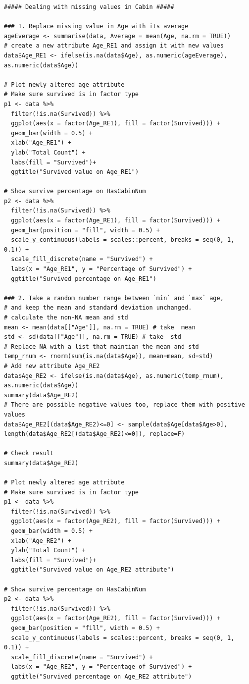\documentclass[
]{book}
\begin{document}
\begin{verbatim}
##### Dealing with missing values in Cabin #####

### 1. Replace missing value in Age with its average
ageEverage <- summarise(data, Average = mean(Age, na.rm = TRUE))
# create a new attribute Age_RE1 and assign it with new values
data$Age_RE1 <- ifelse(is.na(data$Age), as.numeric(ageEverage), as.numeric(data$Age))

# Plot newly altered age attribute
# Make sure survived is in factor type
p1 <- data %>%
  filter(!is.na(Survived)) %>%
  ggplot(aes(x = factor(Age_RE1), fill = factor(Survived))) +
  geom_bar(width = 0.5) +
  xlab("Age_RE1") +
  ylab("Total Count") +
  labs(fill = "Survived")+
  ggtitle("Survived value on Age_RE1")

# Show survive percentage on HasCabinNum
p2 <- data %>%
  filter(!is.na(Survived)) %>%
  ggplot(aes(x = factor(Age_RE1), fill = factor(Survived))) +
  geom_bar(position = "fill", width = 0.5) +
  scale_y_continuous(labels = scales::percent, breaks = seq(0, 1, 0.1)) +
  scale_fill_discrete(name = "Survived") +
  labs(x = "Age_RE1", y = "Percentage of Survived") +
  ggtitle("Survived percentage on Age_RE1")

### 2. Take a random number range between `min` and `max` age,
# and keep the mean and standard deviation unchanged.
# calculate the non-NA mean and std
mean <- mean(data[["Age"]], na.rm = TRUE) # take  mean
std <- sd(data[["Age"]], na.rm = TRUE) # take  std
# Replace NA with a list that maintian the mean and std
temp_rnum <- rnorm(sum(is.na(data$Age)), mean=mean, sd=std)
# Add new attribute Age_RE2
data$Age_RE2 <- ifelse(is.na(data$Age), as.numeric(temp_rnum), as.numeric(data$Age))
summary(data$Age_RE2)
# There are possible negative values too, replace them with positive values
data$Age_RE2[(data$Age_RE2)<=0] <- sample(data$Age[data$Age>0], length(data$Age_RE2[(data$Age_RE2)<=0]), replace=F)

# Check result
summary(data$Age_RE2)

# Plot newly altered age attribute
# Make sure survived is in factor type
p1 <- data %>%
  filter(!is.na(Survived)) %>%
  ggplot(aes(x = factor(Age_RE2), fill = factor(Survived))) +
  geom_bar(width = 0.5) +
  xlab("Age_RE2") +
  ylab("Total Count") +
  labs(fill = "Survived")+
  ggtitle("Survived value on Age_RE2 attribute")

# Show survive percentage on HasCabinNum
p2 <- data %>%
  filter(!is.na(Survived)) %>%
  ggplot(aes(x = factor(Age_RE2), fill = factor(Survived))) +
  geom_bar(position = "fill", width = 0.5) +
  scale_y_continuous(labels = scales::percent, breaks = seq(0, 1, 0.1)) +
  scale_fill_discrete(name = "Survived") +
  labs(x = "Age_RE2", y = "Percentage of Survived") +
  ggtitle("Survived percentage on Age_RE2 attribute")


\end{verbatim}
\end{document}
